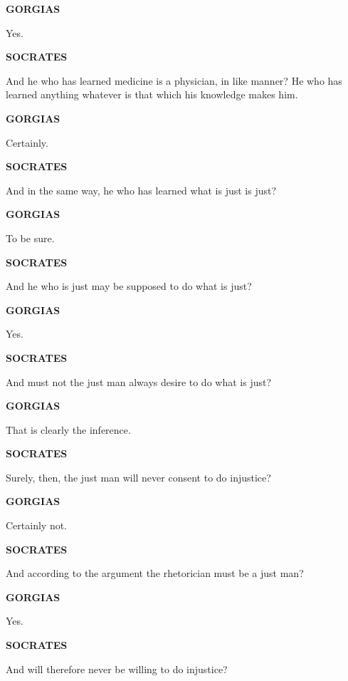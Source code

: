 \documentclass[11pt,letter]{article}
\begin{document}
\par \textbf{GORGIAS}
\par   Yes.

\par \textbf{SOCRATES}
\par   And he who has learned medicine is a physician, in like manner? He who has learned anything whatever is that which his knowledge makes him.

\par \textbf{GORGIAS}
\par   Certainly.

\par \textbf{SOCRATES}
\par   And in the same way, he who has learned what is just is just?

\par \textbf{GORGIAS}
\par   To be sure.

\par \textbf{SOCRATES}
\par   And he who is just may be supposed to do what is just?

\par \textbf{GORGIAS}
\par   Yes.

\par \textbf{SOCRATES}
\par   And must not the just man always desire to do what is just?

\par \textbf{GORGIAS}
\par   That is clearly the inference.

\par \textbf{SOCRATES}
\par   Surely, then, the just man will never consent to do injustice?

\par \textbf{GORGIAS}
\par   Certainly not.

\par \textbf{SOCRATES}
\par   And according to the argument the rhetorician must be a just man?

\par \textbf{GORGIAS}
\par   Yes.

\par \textbf{SOCRATES}
\par   And will therefore never be willing to do injustice?
\end{document}

